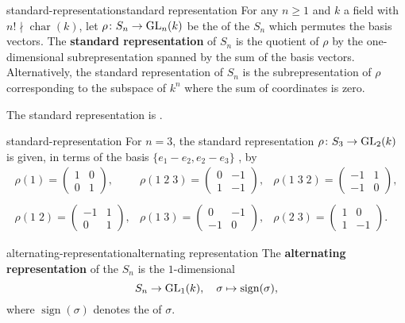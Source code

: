 \begin{topic}{standard-representation}{standard representation}
    For any $n \ge 1$ and $k$ a field with $n! \nmid \operatorname{char}(k)$, let $\rho \colon S_n \to \textup{GL}_n(k)$ be the  of the  $S_n$ which permutes the basis vectors. The \textbf{standard representation} of $S_n$ is the quotient of $\rho$ by the one-dimensional subrepresentation spanned by the sum of the basis vectors. Alternatively, the standard representation of $S_n$ is the subrepresentation of $\rho$ corresponding to the subspace of $k^n$ where the sum of coordinates is zero.
    
    The standard representation is .
\end{topic}

\begin{example}{standard-representation}
    For $n = 3$, the standard representation $\rho \colon S_3 \to \textup{GL}_2(k)$ is given, in terms of the basis $\{ e_1 - e_2, e_2 - e_3 \}$ , by
    \[ \begin{array}{ccc}
        \rho(1) = \begin{pmatrix} 1 & 0 \\ 0 & 1 \end{pmatrix}, &
        \rho(1 \; 2 \; 3) = \begin{pmatrix} 0 & -1 \\ 1 & -1 \end{pmatrix}, &
        \rho(1 \; 3 \; 2) = \begin{pmatrix} -1 & 1 \\ -1 & 0 \end{pmatrix}, \\ & & \\
        \rho(1 \; 2) = \begin{pmatrix} -1 & 1 \\ 0 & 1 \end{pmatrix}, &
        \rho(1 \; 3) = \begin{pmatrix} 0 & -1 \\ -1 & 0 \end{pmatrix}, &
        \rho(2 \; 3) = \begin{pmatrix} 1 & 0 \\ 1 & -1 \end{pmatrix} .
    \end{array} \]
\end{example}

\begin{topic}{alternating-representation}{alternating representation}
    The \textbf{alternating representation} of the  $S_n$ is the $1$-dimensional 
    \[ S_n \to \textup{GL}_1(k), \quad \sigma \mapsto \operatorname{sign}(\sigma), \]
    where $\operatorname{sign}(\sigma)$ denotes the  of $\sigma$.
\end{topic}

